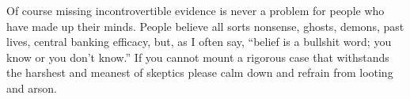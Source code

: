 Of course missing incontrovertible evidence is never a problem for
people who have made up their minds. People believe all sorts nonsense,
ghosts, demons, past lives, central banking efficacy, but, as I often
say, ``belief is a bullshit word; you know or you don't know.'' If you
cannot mount a rigorous case that withstands the
harshest and meanest of skeptics please calm down and refrain
from looting and arson.



%